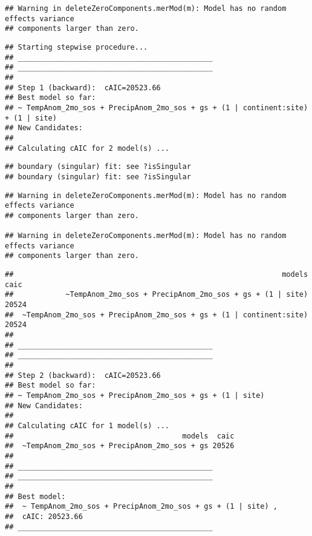\documentclass[
]{article}
\begin{document}
\begin{verbatim}
## Warning in deleteZeroComponents.merMod(m): Model has no random effects variance
## components larger than zero.
\end{verbatim}

\begin{verbatim}
## Starting stepwise procedure...
## _____________________________________________
## _____________________________________________
## 
## Step 1 (backward):  cAIC=20523.66
## Best model so far:
## ~ TempAnom_2mo_sos + PrecipAnom_2mo_sos + gs + (1 | continent:site) + (1 | site)
## New Candidates:
## 
## Calculating cAIC for 2 model(s) ...
\end{verbatim}

\begin{verbatim}
## boundary (singular) fit: see ?isSingular
## boundary (singular) fit: see ?isSingular
\end{verbatim}

\begin{verbatim}
## Warning in deleteZeroComponents.merMod(m): Model has no random effects variance
## components larger than zero.

## Warning in deleteZeroComponents.merMod(m): Model has no random effects variance
## components larger than zero.
\end{verbatim}

\begin{verbatim}
##                                                              models  caic
##            ~TempAnom_2mo_sos + PrecipAnom_2mo_sos + gs + (1 | site) 20524
##  ~TempAnom_2mo_sos + PrecipAnom_2mo_sos + gs + (1 | continent:site) 20524
## 
## _____________________________________________
## _____________________________________________
## 
## Step 2 (backward):  cAIC=20523.66
## Best model so far:
## ~ TempAnom_2mo_sos + PrecipAnom_2mo_sos + gs + (1 | site)
## New Candidates:
## 
## Calculating cAIC for 1 model(s) ...
##                                       models  caic
##  ~TempAnom_2mo_sos + PrecipAnom_2mo_sos + gs 20526
## 
## _____________________________________________
## _____________________________________________
## 
## Best model:
##  ~ TempAnom_2mo_sos + PrecipAnom_2mo_sos + gs + (1 | site) ,
##  cAIC: 20523.66 
## _____________________________________________
\end{verbatim}
\end{document}
